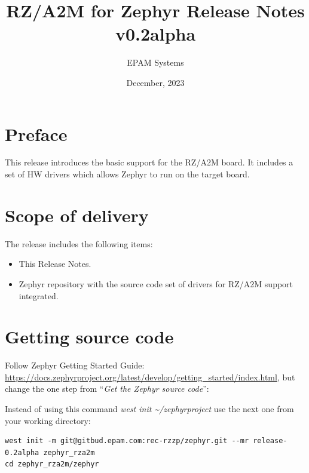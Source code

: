 \documentclass[11pt,a4paper,oneside]{article}
\begin{document}

\setcounter{secnumdepth}{4}
\setcounter{tocdepth}{4}

\title{RZ/A2M for Zephyr Release Notes v0.2alpha}
\author{EPAM Systems}
\date{December, 2023}

\maketitle

\tableofcontents

\clearpage

\section{Preface}\label{preface}

This release introduces the basic support for the RZ/A2M board. It
includes a set of HW drivers which allows Zephyr to run on the target
board.

\section{Scope of delivery}\label{scope-of-delivery}

The release includes the following items:

\begin{itemize}
\item This Release Notes.
\item Zephyr repository with the source code set of drivers for RZ/A2M support integrated.
\end{itemize}

\section{Getting source code}\label{gettig-source-code}

Follow Zephyr Getting Started Guide:
\url{https://docs.zephyrproject.org/latest/develop/getting_started/index.html},
but change the one step from ``\emph{Get the Zephyr source code}'':

Instead of using this command \emph{west init
\textasciitilde/zephyrproject} use the next one from your working
directory:

\begin{lstlisting}
west init -m git@gitbud.epam.com:rec-rzzp/zephyr.git --mr release-0.2alpha zephyr_rza2m
cd zephyr_rza2m/zephyr
\end{lstlisting}
\end{document}
